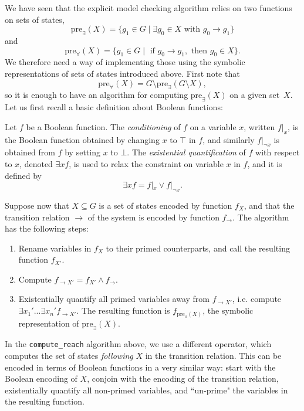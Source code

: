 \documentclass[11pt]{report}
\newenvironment{definition}[1][Definition]{\begin{trivlist}
\item[\hskip \labelsep {\bfseries #1}]}{\end{trivlist}}
\begin{document}
We have seen that the explicit model checking algorithm relies on two functions on sets of states, $$\mbox{pre}_{\exists} (X) = \{g_1 \in G \mid \exists g_0 \in X \mbox{ with } g_0 \rightarrow g_1\}$$ and $$\mbox{pre}_\forall (X) = \{g_1 \in G \mid\mbox{ if }g_0 \rightarrow g_1,\mbox{ then }g_0 \in X\}.$$ We therefore need a way of implementing those using the symbolic representations of sets of states introduced above. First note that $$\mbox{pre}_\forall (X) = G \setminus \mbox{pre}_{\exists} (G \setminus X),$$ so it is enough to have an algorithm for computing $\mbox{pre}_{\exists}(X)$ on a given set~$X$. Let us first recall a basic definition about Boolean functions:

\begin{definition}
\label{exist}
Let $f$ be a Boolean function. The \textit{conditioning} of $f$ on a variable $x$, written $f|_x$, is the Boolean function obtained by changing $x$ to $\top$ in $f$, and similarly $f|_{\lnot x}$
is obtained from $f$ by setting $x$ to $\bot$.
The \textit{existential quantification} of $f$ with respect to $x$, denoted $\exists x f$, is used to relax the constraint on variable $x$ in $f$, and it is defined by $$\exists x f = f|_x \lor f|_{\lnot x}.$$
\end{definition}

Suppose now that $X \subseteq G$ is a set of states encoded by function $f_X$, and that the transition relation $\rightarrow$ of the system is encoded by function $f_\rightarrow$. The algorithm has the following steps:
\begin{enumerate}
\item Rename variables in $f_X$ to their primed counterparts, and call the resulting function $f_{X'}$. 
\item Compute $f_{\rightarrow X'} = f_{X'} \land f_\rightarrow$.
\item Existentially quantify all primed variables away from $f_{\rightarrow X'}$, i.e. compute $\exists x_1' ... \exists x_n' f_{\rightarrow X'}.$ The resulting function is $f_{\mbox{pre}_\exists(X)}$, the symbolic representation of $\mbox{pre}_\exists(X)$.
\end{enumerate}
In the \texttt{compute\_reach} algorithm above, we use a different operator, which computes the set of states \textit{following} $X$ in the transition relation. This can be encoded in terms of Boolean functions in a very similar way: start with the Boolean encoding of $X$, conjoin with the encoding of the transition relation, existentially quantify all non-primed variables, and ``un-prime" the variables in the resulting function.
\end{document}
